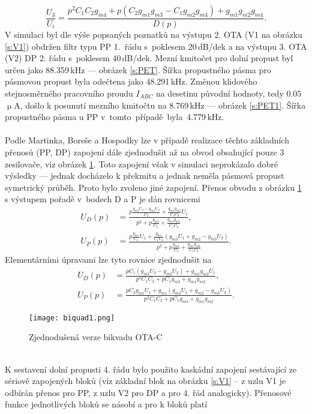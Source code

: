\begin{equation}
\frac{U_3}{U_i} = \frac{p^2C_1C_2g_{m4} + p(C_2g_{m1}g_{m3} - C_1g_{m2}g_{m4}) + g_{m1}g_{m2}g_{m4}}{D(p)}.
\end{equation}
\noindent 
V simulaci byl dle výše popsaných poznatků na výstupu 2. OTA (V1 na obrázku \ref{s:V1}) obdržen filtr typu PP 1.~řádu s~poklesem 20\,dB/dek a na výstupu 3. OTA (V2) DP 2. řádu s~poklesem 40\,dB/dek. Mezní kmitočet pro dolní propust byl určen jako 88.359\,kHz --- obrázek \ref{s:PET}. Šířka propustného pásma pro pásmovou propust byla odečtena jako 48.291\,kHz. Změnou klidového stejnosměrného pracovního proudu $I_{ABC}$ na desetinu původní hodnoty, tedy $0.05$\,$\upmu$A, došlo k posunutí mezního kmitočtu na 8.769\,kHz --- obrázek \ref{s:PET1}. Šířka propustného pásma u PP v~tomto~případě~byla~4.779\,kHz.\\
\\
\noindent Podle Martinka, Boreše a Hospodky \cite{12} lze v případě realizace těchto základních přenosů (PP, DP) zapojení dále zjednodušit až na obvod obsahující pouze 3 zesilovače, viz obrázek \ref{s:BIK2}. Toto zapojení však v simulaci neprokázalo dobré výsledky --- jednak docházelo k překmitu a jednak neměla pásmová propust symetrický průběh. Proto bylo zvoleno jiné zapojení. Přenos obvodu z obrázku \ref{s:BIK2} s výstupem pořadě v~bodech D a P je dán rovnicemi
\begin{align}
U_D(p) &= \frac{p\frac{g_{m3}U_3-g_{m2}U_2}{C_2}+\frac{g_{m1}g_{m2}}{C_1C_2}U_1}{p^2 + p\frac{g_{m3}}{C_2} + \frac{g_{m1}g_{m2}}{C_1C_2}},\\
U_P(p) &= \frac{p\frac{g_{m1}}{C_1}U_1 + \frac{g_{m1}}{C_1C_2}(g_{m3}U_1+g_{m2}-g_{m3}U_3)}{p^2 + p\frac{g_{m3}}{C_2} + \frac{g_{m1}g_{m2}}{C_1C_2}}.
\end{align}
\noindent Elementárními úpravami lze tyto rovnice zjednodušit na
\begin{align}
U_D(p) &= \frac{pC_1(g_{m3}U_3 - g_{m2}U_2) + g_{m1}g_{m2}U_1}{p^2C_1C_2 + pC_1g_{m3} + g_{m1}g_{m2}},\\
U_P(p) &= \frac{pC_2g_{m1}U_1 + g_{m1}(g_{m3}U_1 + g_{m2} - g_{m3}U_3)}{p^2C_1C_2 + pC_1g_{m3} + g_{m1}g_{m2}}.
\end{align}
\begin{figure}[h]
\centering
\texttt{[image: biquad1.png]}
\caption[Zjednodušená verze bikvadu OTA-C]{Zjednodušená verze bikvadu OTA-C \label{s:BIK2}}
\end{figure}
\\
\noindent K sestavení dolní propusti 4. řádu bylo použito kaskádní zapojení sestávající ze sériově zapojených bloků (viz základní blok na obrázku \ref{s:V1} -- z uzlu V1 je odbírán přenos pro PP, z uzlu V2 pro DP a pro 4. řád analogicky). Přenosové funkce jednotlivých bloků se násobí a pro k bloků platí
